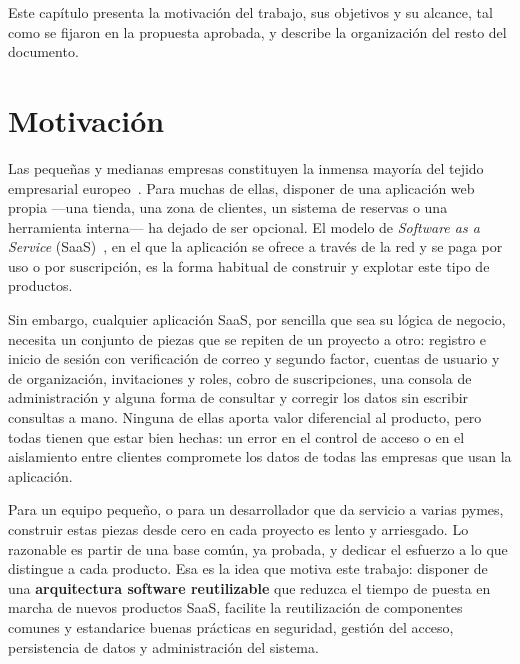 
Este capítulo presenta la motivación del trabajo, sus objetivos y su alcance,
tal como se fijaron en la propuesta aprobada, y describe la organización del
resto del documento.

\section{Motivación}
\label{sec:intro-motivacion}

Las pequeñas y medianas empresas constituyen la inmensa mayoría del tejido
empresarial europeo~\cite{ec-sme-definition}. Para muchas de ellas, disponer
de una aplicación web propia ---una tienda, una zona de clientes, un sistema de
reservas o una herramienta interna--- ha dejado de ser opcional. El modelo de
\textit{Software as a Service} (SaaS)~\cite{nist-cloud}, en el que la aplicación
se ofrece a través de la red y se paga por uso o por suscripción, es la forma
habitual de construir y explotar este tipo de productos.

Sin embargo, cualquier aplicación SaaS, por sencilla que sea su lógica de
negocio, necesita un conjunto de piezas que se repiten de un proyecto a otro:
registro e inicio de sesión con verificación de correo y segundo factor,
cuentas de usuario y de organización, invitaciones y roles, cobro de
suscripciones, una consola de administración y alguna forma de consultar y
corregir los datos sin escribir consultas a mano. Ninguna de ellas aporta
valor diferencial al producto, pero todas tienen que estar bien hechas: un
error en el control de acceso o en el aislamiento entre clientes compromete
los datos de todas las empresas que usan la aplicación.

Para un equipo pequeño, o para un desarrollador que da servicio a varias
pymes, construir estas piezas desde cero en cada proyecto es lento y
arriesgado. Lo razonable es partir de una base común, ya probada, y dedicar
el esfuerzo a lo que distingue a cada producto. Esa es la idea que motiva este
trabajo: disponer de una \textbf{arquitectura software reutilizable} que
reduzca el tiempo de puesta en marcha de nuevos productos SaaS, facilite la
reutilización de componentes comunes y estandarice buenas prácticas en
seguridad, gestión del acceso, persistencia de datos y administración del
sistema.

